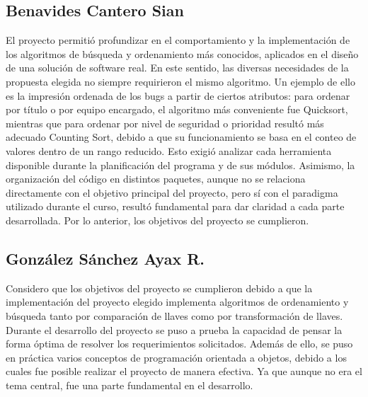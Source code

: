 \documentclass[12pt,letterpaper]{article}
\begin{document}
\subsection{Benavides Cantero Sian}
El proyecto permitió profundizar en el comportamiento y la implementación de los algoritmos de búsqueda y ordenamiento más conocidos, aplicados en el diseño de una solución de software real. En este sentido, las diversas necesidades de la propuesta elegida no siempre requirieron el mismo algoritmo. Un ejemplo de ello es la impresión ordenada de los bugs a partir de ciertos atributos: para ordenar por título o por equipo encargado, el algoritmo más conveniente fue Quicksort, mientras que para ordenar por nivel de seguridad o prioridad resultó más adecuado Counting Sort, debido a que su funcionamiento se basa en el conteo de valores dentro de un rango reducido. Esto exigió analizar cada herramienta disponible durante la planificación del programa y de sus módulos. 
Asimismo, la organización del código en distintos paquetes, aunque no se relaciona directamente con el objetivo principal del proyecto, pero sí con el paradigma utilizado durante el curso, resultó fundamental para dar claridad a cada parte desarrollada. Por lo anterior, los objetivos del proyecto se cumplieron.


\subsection{González Sánchez Ayax R.}
Considero que los objetivos del proyecto se cumplieron debido a que la implementación del proyecto elegido implementa algoritmos de ordenamiento y búsqueda tanto por comparación de llaves como por transformación de llaves. Durante el desarrollo del proyecto se puso a prueba la capacidad de pensar la forma óptima de resolver los requerimientos solicitados. Además de ello, se puso en práctica varios conceptos de programación orientada a objetos, debido a los cuales fue posible realizar el proyecto de manera efectiva. Ya que aunque no era el tema central, fue una parte fundamental en el desarrollo.
\end{document}
